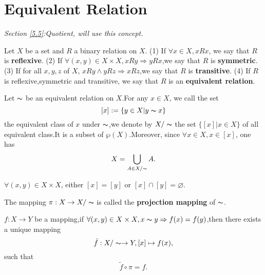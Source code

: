 \documentclass{book}
\numberwithin{equation}{section}
\begin{document}
\section{Equivalent Relation}\label{4.2}
\textit{Section \ref{5.5}:Quotient, will use this concept.}
\begin{definitionenv}
    Let $X$ be a set and $R$ a binary relation on $X$.
    \newline
    (1) If $\forall x \in X ,xRx$, we say that $R$ is \textbf{reflexive}.
    \newline
    (2) If $\forall (x,y) \in X\times X,xRy\Rightarrow yRx$,we say that $R$ is \textbf{symmetric}.
    \newline
    (3) If for all $x,y,z$ of $X$, $xRy\wedge yRz\Rightarrow xRz$,we say that $R$ is \textbf{transitive}.
    \newline
    (4) If $R$ is reflexive,symmetric and transitive, we say that $R$ is an \textbf{equivalent relation}.

\end{definitionenv}
\begin{definitionenv}
    Let $\thicksim$ be an equivalent relation on $X$.For any $x\in X$, we call the set $$[x]:=\{y\in X|y\thicksim x\}$$ the equivalent class of $x$ under $\thicksim$,we denote by $X/\thicksim$ the set $\{[x]|x\in X\}$ of all equivalent class.It is a subset of $\wp (X)$.Moreover, since $\forall x\in X,x\in [x] $, one has $$X=\bigcup_{A\in X/\thicksim}A.$$
\end{definitionenv}
\begin{propositionenv}
    $\forall (x,y)\in X\times X$, either $[x]=[y]$ or $[x]\cap [y]=\varnothing$.
\end{propositionenv}
\begin{definitionenv}
    The mapping $\pi :X\rightarrow X/\thicksim$ is called the \textbf{projection mapping} of $\thicksim$.
\end{definitionenv}
\begin{propositionenv}\label{4.2.5}
    $f:X\rightarrow Y$ be a mapping,if $\forall (x,y)\in X\times X,x\thicksim y\Rightarrow f(x)=f(y)$,then there exists a unique mapping$$\tilde{f}:X/\thicksim\rightarrow Y, [x]\mapsto f(x),$$ such that $$\tilde{f}\circ \pi =f.$$


\begin{center}
\end{center}
\end{propositionenv}
\end{document}
